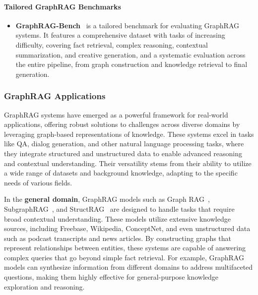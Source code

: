 \documentclass[lettersize,journal]{IEEEtran}
\begin{document}
\paragraph{Tailored GraphRAG Benchmarks}
\begin{itemize}
     \item \textbf{GraphRAG-Bench}~\cite{xiang2025use} is a tailored benchmark for evaluating GraphRAG systems. It features a comprehensive dataset with tasks of increasing difficulty, covering fact retrieval, complex reasoning, contextual summarization, and creative generation, and a systematic evaluation across the entire pipeline, from graph construction and knowledge retrieval to final generation.
\end{itemize}


\subsubsection{GraphRAG Applications}

GraphRAG systems have emerged as a powerful framework for real-world applications, offering robust solutions to challenges across diverse domains by leveraging graph-based representations of knowledge. These systems excel in tasks like QA, dialog generation, and other natural language processing tasks, where they integrate structured and unstructured data to enable advanced reasoning and contextual understanding. Their versatility stems from their ability to utilize a wide range of datasets and background knowledge, adapting to the specific needs of various fields.

In the \textbf{general domain}, GraphRAG models such as Graph RAG~\cite{edge2024local}, SubgraphRAG~\cite{li2024simple}, and StructRAG~\cite{li2024structrag} are designed to handle tasks that require broad contextual understanding. These models utilize extensive knowledge sources, including Freebase, Wikipedia, ConceptNet, and even unstructured data such as podcast transcripts and news articles. By constructing graphs that represent relationships between entities, these systems are capable of answering complex queries that go beyond simple fact retrieval. For example, GraphRAG models can synthesize information from different domains to address multifaceted questions, making them highly effective for general-purpose knowledge exploration and reasoning.
\end{document}

